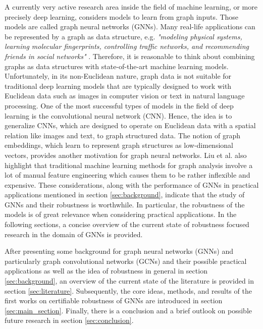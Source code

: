 \documentclass[a4paper,preprint]{sig-alternate}
\begin{document}
A currently very active research area inside the field of machine learning, or more precisely deep learning, considers models to learn
from graph inputs. Those models are called graph neural networks (GNNs). 
Many real-life applications can be represented by a graph as data structure, e.g. \textit{"modeling physical systems, learning molecular fingerprints,
controlling traffic networks, and recommending friends in social networks"} \cite{Liu_2020}. 
Therefore, it is reasonable to think about combining graphs as data structures with state-of-the-art machine learning models.
Unfortunately, in its non-Euclidean nature, graph data is not suitable for traditional deep learning models that are typically designed 
to work with Euclidean data such as images in computer vision or text in natural language processing. \cite{Liu_2020}
One of the most successful types of models in the field of deep learning is the convolutional neural network (CNN).
Hence, the idea is to generalize CNNs, which are designed to operate on Euclidean data with a spatial relation like 
images and text, to graph structured data. \cite{Liu_2020}
The notion of graph embeddings, which learn to represent graph structures as low-dimensional vectors, provides
another motivation for graph neural networks. \cite{Liu_2020}
Liu et al. also highlight that traditional machine learning methods for graph analysis involve a lot of manual feature engineering
which causes them to be rather inflexible and expensive.
These considerations, along with the performance of GNNs in practical applications mentioned in section \ref{sec:background}, 
indicate that the study of GNNs and their robustness is worthwhile.
In particular, the robustness of the models is of great relevance when considering practical applications.
In the following sections, a concise overview of the current state of robustness focused research in the domain of GNNs is provided.\newline

After presenting some background for graph neural networks (GNNs) and particularly graph convolutional networks (GCNs)
and their possible practical applications as well as the idea of robustness in general in section \ref{sec:background}, 
an overview of the current state of the literature is provided in section \ref{sec:literature}. Subsequently, the core ideas,
methods, and results of the first works on certifiable robustness of GNNs are introduced in section \ref{sec:main_section}.
Finally, there is a conclusion and a brief outlook on possible future research in section \ref{sec:conclusion}.
\end{document}

